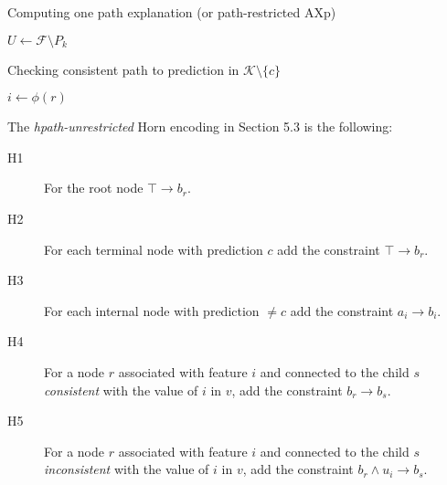 \begin{itemize}
\begin{algorithm}
\caption{Computing one path explanation (or path-restricted AXp)}
\label{alg:FindAXp}


$U \leftarrow \mathcal{F} \setminus P_k$
 
\end{algorithm}

\begin{algorithm}
\caption{Checking consistent path to prediction in $\mathcal{K} \setminus \{c\}$}
\label{alg:ExistsConsistentQPath}


$i \leftarrow \phi(r)$ 
 
\end{algorithm}

The \emph{hpath-unrestricted} Horn encoding in Section 5.3 is the following:

\begin{description}
    \item[H1] For the root node $\top \rightarrow b_r$.
    \item[H2] For each terminal node with prediction $c$ add the constraint $\top \rightarrow b_r$.
    \item[H3] For each internal node with prediction $\neq c$ add the constraint $a_i \rightarrow b_i$.
    \item[H4] For a node $r$ associated with feature $i$ and connected to 
    the child $s$ \emph{consistent} with the value of $i$ in $v$, add the constraint
    $b_r \rightarrow b_s$.
    \item[H5] For a node $r$ associated with feature $i$ and connected to 
    the child $s$ \emph{inconsistent} with the value of $i$ in $v$, add the constraint
    $b_r \land u_i \rightarrow b_s$.
\end{description}


\end{itemize}
